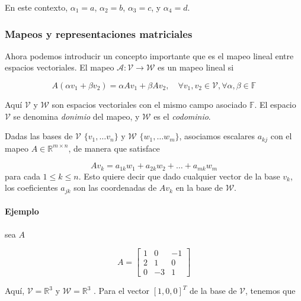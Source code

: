En este contexto, \( \alpha_1 = a \), \( \alpha_2 = b \), \( \alpha_3 = c \), y \( \alpha_4 = d \).

\subsubsection{Mapeos y representaciones matriciales} 
Ahora podemos introducir un concepto importante que es el mapeo lineal entre espacios vectoriales. El mapeo $\mathcal{A}:\mathcal{V} \to \mathcal{W}$ es un mapeo lineal si

\begin{equation*}
A(\alpha v_1 + \beta v_2) = \alpha A v_1 + \beta A v_2, \quad \forall v_1, v_2 \in \mathcal{V}, \forall \alpha, \beta \in \mathbb{F}
\end{equation*}

Aquí $\mathcal{V}$ y $\mathcal{W}$ son espacios vectoriales con el mismo campo asociado $\mathbb{F}$. El espacio  $\mathcal{V}$ se denomina \textit{donimio} del mapeo, y  $\mathcal{W}$ es el \textit{codominio}.

Dadas las bases de $\mathcal{V}$ $\{ v_1, \dots v_n \}$ y  $\mathcal{W}$  $\{ w_1, \dots w_m \}$,  asociamos escalares $a_{kj}$ con el mapeo $A \in \mathbb{R}^{m \times n}$, de manera que satisface

\begin{equation*}
Av_k = a_{1k} w_1 + a_{2k} w_2 + \dots + a_{mk} w_m
\end{equation*}
para cada $1 \leq k \leq n$. Esto quiere decir que dado cualquier vector de la base $v_k$, los coeficientes $a_{jk}$ son las coordenadas de $Av_k$  en la base de  $\mathcal{W}$.

\paragraph*{Ejemplo} sea $A$

\begin{equation*}
A = \left[ \begin{array}{ccc}
    1 & 0 & -1\\
    2 & 1 & 0\\
    0 & -3 & 1
\end{array}
\right]
\end{equation*}

Aquí,  $\mathcal{V} = \mathbb{R}^3$  y $\mathcal{W} = \mathbb{R}^3$ . Para el vector $[1,0,0]^T$ de la base de  $\mathcal{V}$, tenemos que 

